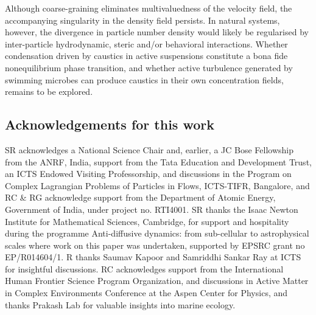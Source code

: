 \documentclass[../Rajarshi-thesis-draft.tex]{subfiles}
\begin{document}
Although coarse-graining eliminates multivaluedness of the velocity field, the accompanying singularity in the density field persists. In natural systems, however, the divergence in particle number density would likely be regularised by inter-particle hydrodynamic, steric and/or behavioral interactions. Whether condensation driven by caustics in active suspensions constitute a bona fide nonequilibrium phase transition, and whether active turbulence generated by swimming microbes can produce caustics in their own concentration fields, remains to be explored.

\medskip
\subsection*{Acknowledgements for this work}
SR acknowledges a National Science Chair and, earlier, a JC Bose Fellowship from the ANRF, India, support from the Tata Education and Development Trust, an ICTS Endowed Visiting Professorship, and discussions in the Program on Complex Lagrangian Problems of Particles in Flows, ICTS-TIFR, Bangalore, and RC \& RG acknowledge support from the Department of Atomic Energy, Government of India, under project no. RTI4001. SR thanks the Isaac Newton Institute for Mathematical Sciences, Cambridge, for support and hospitality during the programme Anti-diffusive dynamics: from sub-cellular to astrophysical scales where work on this paper was undertaken, supported by EPSRC grant no EP/R014604/1. R thanks Saumav Kapoor and Samriddhi Sankar Ray at ICTS for insightful discussions. RC acknowledges support from the International Human Frontier Science Program Organization, and discussions in Active Matter in Complex Environments Conference at the Aspen Center for Physics, and thanks Prakash Lab for valuable insights into marine ecology.
\end{document}
